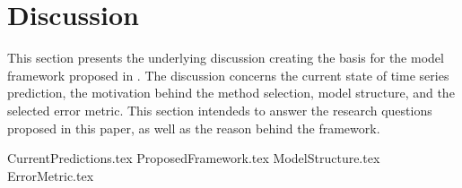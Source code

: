 
\section{Discussion}
\label{section:Discussion:Discussion}



This section presents the underlying discussion creating the basis for the model framework proposed in .
The discussion concerns the current state of time series prediction, the motivation behind the method selection, model structure, and the selected error metric.
This section intendeds to answer the research questions proposed in this paper,
as well as the reason behind the framework.


{CurrentPredictions.tex}
{ProposedFramework.tex}
{ModelStructure.tex}
{ErrorMetric.tex}



\iffalse
  In the discussion it is important to include a discussion of not just the merits of the work conducted but also the limitations.
\fi
